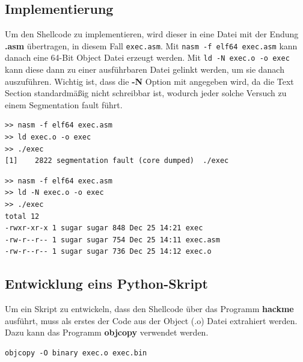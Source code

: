 \documentclass[12pt]{article}
\begin{document}
\subsection{Implementierung}
Um den Shellcode zu implementieren, wird dieser in eine Datei mit der Endung \textbf{.asm} übertragen, in diesem Fall \texttt{exec.asm}.
\newline
\newline
Mit \texttt{nasm -f elf64 exec.asm} kann danach eine 64-Bit Object Datei erzeugt werden.
\newline
\newline
Mit \texttt{ld -N exec.o -o exec} kann diese dann zu einer ausführbaren Datei gelinkt werden, um sie danach auszuführen. Wichtig ist, dass die \textbf{-N} Option mit angegeben wird, da die Text Section standardmäßig nicht schreibbar ist, wodurch jeder solche Versuch zu einem Segmentation fault führt.

\begin{lstlisting}[caption={Ohne -N Option}, captionpos=t]
>> nasm -f elf64 exec.asm
>> ld exec.o -o exec
>> ./exec
[1]    2822 segmentation fault (core dumped)  ./exec
\end{lstlisting}


\begin{lstlisting}[caption={Mit -N Option}, captionpos=t]
>> nasm -f elf64 exec.asm
>> ld -N exec.o -o exec
>> ./exec
total 12
-rwxr-xr-x 1 sugar sugar 848 Dec 25 14:21 exec
-rw-r--r-- 1 sugar sugar 754 Dec 25 14:11 exec.asm
-rw-r--r-- 1 sugar sugar 736 Dec 25 14:12 exec.o
\end{lstlisting}

\subsection{Entwicklung eins Python-Skript}
Um ein Skript zu entwickeln, dass den Shellcode über das Programm \textbf{hackme} ausführt, muss als erstes der Code aus der Object (.o) Datei extrahiert werden. Dazu kann das Programm \textbf{objcopy} verwendet werden.

\begin{lstlisting}
objcopy -O binary exec.o exec.bin
\end{lstlisting}
\end{document}
